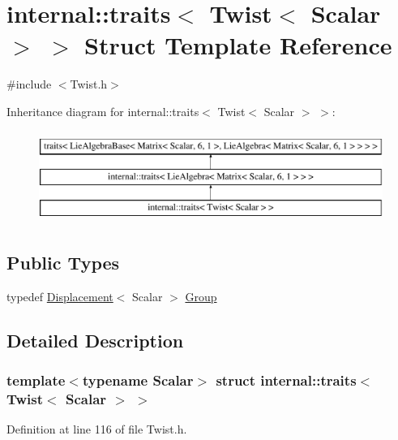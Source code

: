 \hypertarget{structinternal_1_1traits_3_01_twist_3_01_scalar_01_4_01_4}{}\section{internal\+:\+:traits$<$ Twist$<$ Scalar $>$ $>$ Struct Template Reference}
\label{structinternal_1_1traits_3_01_twist_3_01_scalar_01_4_01_4}


{\ttfamily \#include $<$Twist.\+h$>$}

Inheritance diagram for internal\+:\+:traits$<$ Twist$<$ Scalar $>$ $>$\+:\begin{figure}[H]
\begin{center}
\leavevmode
\includegraphics[height=3.000000cm]{structinternal_1_1traits_3_01_twist_3_01_scalar_01_4_01_4}
\end{center}
\end{figure}
\subsection*{Public Types}
\begin{DoxyCompactItemize}
\item 
typedef \hyperlink{class_displacement}{Displacement}$<$ Scalar $>$ \hyperlink{structinternal_1_1traits_3_01_twist_3_01_scalar_01_4_01_4_a7dd4af76dbf2ef6b4e68ceb1249d14c9}{Group}
\end{DoxyCompactItemize}


\subsection{Detailed Description}
\subsubsection*{template$<$typename Scalar$>$\newline
struct internal\+::traits$<$ Twist$<$ Scalar $>$ $>$}



Definition at line 116 of file Twist.\+h.



